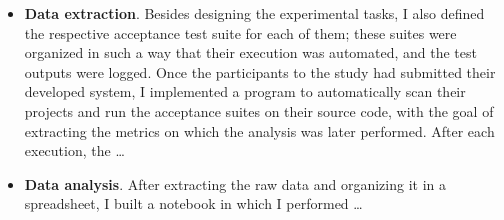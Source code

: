 \begin{itemize}
    \item \textbf{Data extraction}. 
    Besides designing the experimental tasks, I also defined the respective acceptance test suite for each of them; these suites were organized in such a way that their execution was automated, and the test outputs were logged.
    Once the participants to the study had submitted their developed system, I implemented a program to automatically scan their projects and run the acceptance suites on their source code, with the goal of extracting the metrics on which the analysis was later performed. 
    After each execution, the \dots

    \item\textbf{Data analysis}.
    After extracting the raw data and organizing it in a spreadsheet, I built a notebook in which I performed  \dots
\end{itemize}